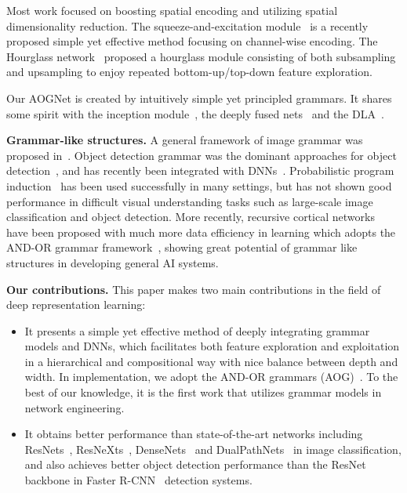 \documentclass[10pt,twocolumn,letterpaper]{article}
\begin{document}
Most work focused on boosting spatial encoding and utilizing spatial dimensionality reduction. The squeeze-and-excitation module~\cite{SENet} is a recently proposed simple yet effective method focusing on channel-wise encoding. The Hourglass network~\cite{Hourglass} proposed a hourglass module consisting of both subsampling and upsampling to enjoy repeated bottom-up/top-down feature exploration.

Our AOGNet is created by intuitively simple yet principled grammars. It shares some spirit with the inception module~\cite{InceptionNet}, the deeply fused nets~\cite{DFN} and the DLA~\cite{DLA}. 




\textbf{Grammar-like structures.} A general framework of image grammar was proposed in~\cite{Zhu_Grammar}. Object detection grammar was the dominant approaches for object detection~\cite{Pff_Grammar,Yuille_AndOr,DisAOT-CVPR,AOGShape,StochasticGrammar}, and has recently been integrated with DNNs~\cite{YingWu_CompositionalPose,YingWu_CompositionalModel}. Probabilistic program induction~\cite{ProbabilisticPrograming,lake15science,BuildMachineLikePeople} has been used successfully in many settings, but has not shown good performance in difficult visual understanding tasks such as large-scale image classification and object detection. More recently, recursive cortical networks~\cite{RCN} have been proposed with much more data efficiency in learning which adopts the AND-OR grammar framework~\cite{Zhu_Grammar}, showing great potential of grammar like structures in developing general AI systems. 

\textbf{Our contributions.} This paper makes two main contributions in the field of deep representation learning: 
\begin{itemize}[leftmargin=*]
\itemsep0em
    \item It presents a simple yet effective method of deeply integrating grammar models and DNNs, which facilitates both feature exploration and exploitation in a hierarchical and compositional way with nice balance between depth and width. In implementation, we adopt the AND-OR grammars (AOG)~\cite{DisAOT-CVPR,Zhu_Grammar,Yuille_AndOr}. To the best of our knowledge, it is the first work that utilizes grammar models in network engineering. %
    \item It obtains better performance than state-of-the-art networks including ResNets~\cite{ResidualNet}, ResNeXts~\cite{ResNeXt}, DenseNets~\cite{DenseNet} and DualPathNets~\cite{DPN} in image classification, and also achieves better object detection performance than the ResNet backbone in Faster R-CNN~\cite{FasterRCNN} detection systems. 
\end{itemize}
\end{document}
